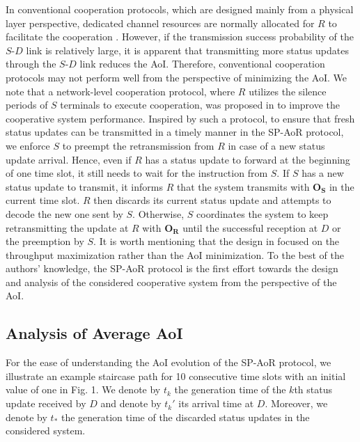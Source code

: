 \documentclass{IEEEtran}
\begin{document}
In conventional cooperation protocols, which are designed mainly from a physical layer perspective, dedicated channel resources are normally allocated for $R$ to facilitate the cooperation \cite{b5}. However, if the transmission success probability of the $S$-$D$ link is relatively large, it is apparent that transmitting more status updates through the $S$-$D$ link reduces the AoI. Therefore, conventional cooperation protocols may not perform well from the perspective of minimizing the AoI. We note that a network-level cooperation protocol, where $R$ utilizes the silence periods of $S$ terminals to execute cooperation, was proposed in \cite{b6} to improve the cooperative system performance. Inspired by such a protocol, to ensure that fresh status updates can be transmitted in a timely manner in the SP-AoR protocol, we enforce $S$ to preempt the retransmission from $R$ in case of a new status update arrival. Hence, even if $R$ has a status update to forward at the beginning of one time slot, it still needs to wait for the instruction from $S$. If $S$ has a new status update to transmit, it informs $R$ that the system transmits with $\mathbf{O}_{\mathbf{S}}$ in the current time slot. $R$ then discards its current status update and attempts to decode the new one sent by $S$. Otherwise, $S$ coordinates the system to keep retransmitting the update at $R$ with $\mathbf{O}_{\mathbf{R}}$ until the successful reception at $D$ or the preemption by $S$. It is worth mentioning that the design in \cite{b6} focused on the throughput maximization rather than the AoI minimization. To the best of the authors' knowledge, the SP-AoR protocol is the first effort towards the design and analysis of the considered cooperative system from the perspective of the AoI.
\vspace{-0.13cm}
\subsection{Analysis of Average AoI}\label{3B}
For the ease of understanding the AoI evolution of the SP-AoR protocol, we illustrate an example staircase path for 10 consecutive time slots with an initial value of one in Fig. 1. We denote by $t_k$ the generation time of the $k$th status update received by $D$ and denote by $t_k'$ its arrival time at $D$. Moreover, we denote by $t_*$ the generation time of the discarded status updates in the considered system. 

\end{document}
